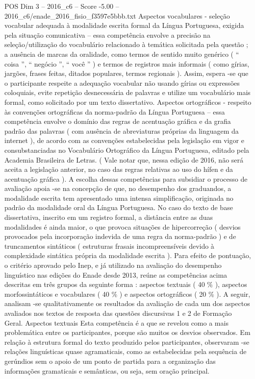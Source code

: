 \begin{textsample}{POS Dim 3 – 2016\_c6 – Score -5.00 – 2016\_c6/enade\_2016\_fisio\_f3597e5bbb.txt}
Aspectos vocabulares - seleção vocabular adequada à modalidade escrita formal da Língua Portuguesa, exigida pela situação comunicativa – essa competência envolve a precisão na seleção/utilização do vocabulário relacionado à temática solicitada pela questão ; a ausência de marcas da oralidade, como termos de sentido muito genérico ( “ coisa ”, “ negócio ”, “ você ” ) e termos de registros mais informais ( como gírias, jargões, frases feitas, ditados populares, termos regionais ).
Assim, espera -se que o participante respeite a adequação vocabular não usando gírias ou expressões coloquiais, evite repetição desnecessária de palavras e utilize um vocabulário mais formal, como solicitado por um texto dissertativo.
Aspectos ortográficos - respeito às convenções ortográficas da norma-padrão da Língua Portuguesa – essa competência envolve o domínio das regras de acentuação gráfica e da grafia padrão das palavras ( com ausência de abreviaturas próprias da linguagem da internet ), de acordo com as convenções estabelecidas pela legislação em vigor e consubstanciadas no Vocabulário Ortográfico da Língua Portuguesa, editado pela Academia Brasileira de Letras. ( Vale notar que, nessa edição de 2016, não será aceita a legislação anterior, no caso das regras relativas ao uso do hífen e da acentuação gráfica ).
A escolha dessas competências para subsidiar o processo de avaliação apoia -se na concepção de que, no desempenho dos graduandos, a modalidade escrita tem apresentado uma intensa simplificação, originada no padrão da modalidade oral da Língua Portuguesa.
No caso do texto de base dissertativa, inscrito em um registro formal, a distância entre as duas modalidades é ainda maior, o que provoca situações de hipercorreção ( desvios provocados pela incorporação indevida de uma regra da norma-padrão ) e de truncamentos sintáticos ( estruturas frasais incompreensíveis devido à complexidade sintática própria da modalidade escrita ).
Para efeito de pontuação, o critério aprovado pelo Inep, e já utilizado na avaliação do desempenho linguístico nas edições do Enade desde 2013, reúne as competências acima descritas em três grupos da seguinte forma : aspectos textuais ( 40 \% ), aspectos morfossintáticos e vocabulares ( 40 \% ) e aspectos ortográficos ( 20 \% ).
A seguir, analisam -se qualitativamente os resultados da avaliação de cada um dos aspectos avaliados nos textos de resposta das questões discursivas 1 e 2 de Formação Geral.
Aspectos textuais Esta competência é a que se revelou como a mais problemática entre os participantes, porque são muitos os desvios observados.
Em relação à estrutura formal do texto produzido pelos participantes, observaram -se relações linguísticas quase agramaticais, como as estabelecidas pela sequência de gerúndios sem o apoio de um ponto de partida para a organização das informações gramaticais e semânticas, ou seja, sem oração principal.

\end{textsample}
